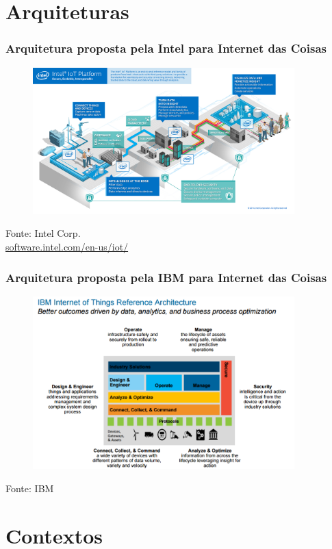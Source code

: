 \documentclass[t]{beamer}
\begin{document}
\section{Arquiteturas}

\begin{frame}
	\frametitle{Arquitetura proposta pela Intel para Internet das Coisas}
	\begin{figure}
		\includegraphics[width=0.9\textwidth]{inteliotplatform}
	\end{figure}
	\scriptsize Fonte: Intel Corp.\\
	\tiny \url{software.intel.com/en-us/iot/}
\end{frame}

\begin{frame}
\frametitle{Arquitetura proposta pela IBM para Internet das Coisas}
\begin{figure}
	\includegraphics[width=0.9\textwidth]{arquiteturaiotibm}
\end{figure}
\scriptsize Fonte: IBM
\end{frame}

\section{Contextos}
\end{document}

